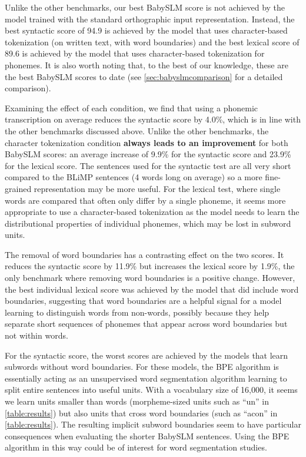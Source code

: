 Unlike the other benchmarks, our best BabySLM score is not achieved by the model trained with the standard orthographic input representation. Instead, the best syntactic score of 94.9 is achieved by the model that uses character-based tokenization (on written text, with word boundaries) and the best lexical score of 89.6 is achieved by the model that uses character-based tokenization for phonemes. It is also worth noting that, to the best of our knowledge, these are the best BabySLM scores to date (see \cref{sec:babyslmcomparison} for a detailed comparison).

Examining the effect of each condition, we find that using a phonemic transcription on average reduces the syntactic score by 4.0\%, which is in line with the other benchmarks discussed above. Unlike the other benchmarks, the character tokenization condition \textbf{always leads to an improvement} for both BabySLM scores: an average increase of 9.9\% for the syntactic score and 23.9\% for the lexical score. The sentences used for the syntactic test are all very short compared to the BLiMP sentences (4 words long on average) so a more fine-grained representation may be more useful. For the lexical test, where single words are compared that often only differ by a single phoneme, it seems more appropriate to use a character-based tokenization as the model needs to learn the distributional properties of individual phonemes, which may be lost in subword units. 

The removal of word boundaries has a contrasting effect on the two scores. It reduces the syntactic score by 11.9\% but increases the lexical score by 1.9\%, the only benchmark where removing word boundaries is a positive change. However, the best individual lexical score was achieved by the model that did include word boundaries, suggesting that word boundaries are a helpful signal for a model learning to distinguish words from non-words, possibly because they help separate short sequences of phonemes that appear across word boundaries but not within words. 


For the syntactic score, the worst scores are achieved by the models that learn subwords without word boundaries. For these models, the BPE algorithm is essentially acting as an unsupervised word segmentation algorithm learning to split entire sentences into useful units. With a vocabulary size of 16,000, it seems we learn units smaller than words (morpheme-sized units such as ``un'' in \cref{table:results}) but also units that cross word boundaries (such as ``acon'' in \cref{table:results}). The resulting implicit subword boundaries seem to have particular consequences when evaluating the shorter BabySLM sentences. Using the BPE algorithm in this way could be of interest for word segmentation studies. 

